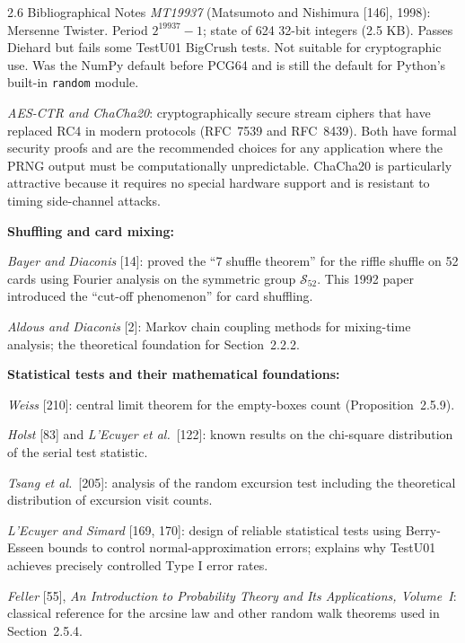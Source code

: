 \documentclass[aspectratio=169,10pt]{beamer}
\begin{document}
\begin{frame}[allowframebreaks]{2.6 Bibliographical Notes}
\emph{MT19937} (Matsumoto and Nishimura [146], 1998): Mersenne Twister.
Period $2^{19937}-1$; state of 624 32-bit integers (2.5 KB).  Passes
Diehard but fails some TestU01 BigCrush tests.  Not suitable for
cryptographic use.  Was the NumPy default before PCG64 and is still the
default for Python's built-in \texttt{random} module.

\emph{AES-CTR and ChaCha20}: cryptographically secure stream ciphers that
have replaced RC4 in modern protocols (RFC~7539 and RFC~8439).  Both have
formal security proofs and are the recommended choices for any application
where the PRNG output must be computationally unpredictable.  ChaCha20 is
particularly attractive because it requires no special hardware support
and is resistant to timing side-channel attacks.

\medskip
\textbf{Shuffling and card mixing:}

\emph{Bayer and Diaconis} [14]: proved the ``7 shuffle theorem'' for the
riffle shuffle on 52 cards using Fourier analysis on the symmetric group
$\mathcal{S}_{52}$.  This 1992 paper introduced the ``cut-off phenomenon''
for card shuffling.

\emph{Aldous and Diaconis} [2]: Markov chain coupling methods for mixing-time
analysis; the theoretical foundation for Section~2.2.2.

\medskip
\textbf{Statistical tests and their mathematical foundations:}

\emph{Weiss} [210]: central limit theorem for the empty-boxes count
(Proposition~2.5.9).

\emph{Holst} [83] and \emph{L'Ecuyer et al.}\ [122]: known results on the
chi-square distribution of the serial test statistic.

\emph{Tsang et al.}\ [205]: analysis of the random excursion test including
the theoretical distribution of excursion visit counts.

\emph{L'Ecuyer and Simard} [169, 170]: design of reliable statistical tests
using Berry-Esseen bounds to control normal-approximation errors; explains
why TestU01 achieves precisely controlled Type I error rates.

\emph{Feller} [55], \emph{An Introduction to Probability Theory and Its
Applications, Volume~I}: classical reference for the arcsine law and other
random walk theorems used in Section~2.5.4.

\end{frame}
\end{document}
